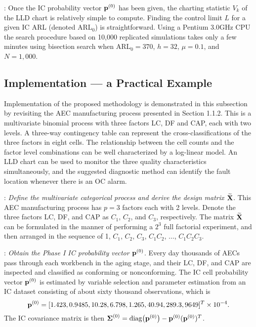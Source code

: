 : Once the IC probability vector ${\bf p}^{(0)}$ has
been given, the charting statistic $V_k$ of the LLD chart is relatively simple to
compute. Finding the control limit $L$ for a given IC ARL (denoted ARL$_0$) is
straightforward. Using a Pentium 3.0GHz CPU the search procedure based on 10,000
replicated simulations takes only a few minutes using bisection search when
ARL$_0=370$, $h=32$, $\mu=0.1$, and $N=1,000$.

\subsection{Implementation --- a Practical Example}

Implementation of the proposed methodology is demonstrated in this subsection by
revisiting the AEC manufacturing process presented in Section 1.1.2. This is a
multivariate binomial process with three factors LC, DF and CAP, each with two
levels. A three-way contingency table can represent the cross-classifications of the
three factors in eight cells. The relationship between the cell counts and the
factor level combinations can be well characterized by a log-linear model. An LLD
chart can be used to monitor the three quality characteristics simultaneously, and
the suggested diagnostic method can identify the fault location whenever there is an
OC alarm.

: {\it Define the multivariate categorical process and derive
the design matrix $\widetilde{{\bf X}}$}. This AEC manufacturing process has $p=3$
factors each with 2 levels. Denote the three factors LC, DF, and CAP as $C_1$,
$C_2$, and $C_3$, respectively. The matrix $\widetilde{{\bf X}}$ can be formulated
in the manner of performing a $2^3$ full factorial experiment, and then arranged in
the sequence of 1, $C_1$, $C_2$, $C_3$, $C_1C_2$, $\ldots$, $C_1C_2C_3$.

: {\it Obtain the Phase I IC probability vector ${\bf
p}^{(0)}$}. Every day thousands of AECs pass through each workbench in the aging
stage, and their LC, DF, and CAP are inspected and classified as conforming or
nonconforming. The IC cell probability vector ${\bf p}^{(0)}$ is estimated by
variable selection and parameter estimation from an IC dataset consisting of about
sixty thousand observations, which is
\[
{\bf p}^{(0)}=[1.423, 0.9485, 10.28, 6.798, 1.265, 40.94, 289.3, 9649]^T\times
10^{-4}.
\]
The IC covariance matrix is then $\boldsymbol{\Sigma}^{(0)}=\mathrm{diag}\big({\bf p}^{(0)}\big)-{\bf
p}^{(0)}({\bf p}^{(0)})^T$.

